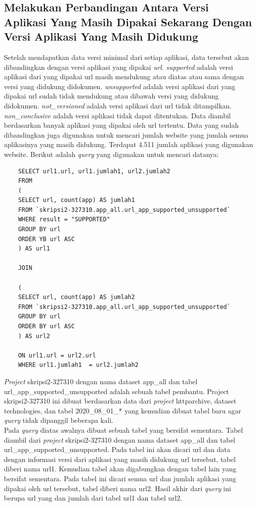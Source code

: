\subsection{Melakukan Perbandingan Antara Versi Aplikasi Yang Masih Dipakai Sekarang Dengan Versi Aplikasi Yang Masih Didukung}
Setelah mendapatkan data versi minimal dari setiap aplikasi, data tersebut akan dibandingkan dengan versi aplikasi yang dipakai \textit{url}. \textit{supported} adalah versi aplikasi dari yang dipakai url masih mendukung atau diatas atau sama dengan versi yang didukung didokumen. \textit{unsupported} adalah versi aplikasi dari yang dipakai url sudah tidak mendukung atau dibawah versi yang didukung didokumen. \textit{not\_versioned} adalah versi aplikasi dari url tidak ditampilkan. \textit{non\_conclusive} adalah versi aplikasi tidak dapat ditentukan. Data diambil berdasarkan banyak aplikasi yang dipakai oleh url tertentu. Data yang sudah dibandingkan juga digunakan untuk mencari jumlah website yang jumlah semua aplikasinya yang masih didukung. Terdapat 4.511 jumlah aplikasi yang digunakan website. Berikut adalah \textit{query} yang digunakan untuk mencari datanya:

\begin{lstlisting}
	SELECT url1.url, url1.jumlah1, url2.jumlah2
	FROM 
	(
	SELECT url, count(app) AS jumlah1
	FROM `skripsi2-327310.app_all.url_app_supported_unsupported`
	WHERE result = "SUPPORTED"
	GROUP BY url
	ORDER YB url ASC
	) AS url1
	
	JOIN 
	
	(
	SELECT url, count(app) AS jumlah2
	FROM `skripsi2-327310.app_all.url_app_supported_unsupported`
	GROUP BY url
	ORDER BY url ASC
	) AS url2
	
	ON url1.url = url2.url
	WHERE url1.jumlah1  = url2.jumlah2 
\end{lstlisting}
\textit{Project} skripsi2-327310 dengan nama dataset app\_all dan tabel url\_app\_supported\_unsupported adalah sebuah tabel pembantu. Project skripsi2-327310 ini dibuat berdasarkan data dari \textit{project} httparchive, dataset technologies, dan tabel 2020\_08\_01\_* yang kemudian dibuat tabel baru agar \textit{query} tidak dipanggil beberapa kali. \\
Pada \textit{query} diatas awalnya dibuat sebuah tabel yang bersifat sementara. Tabel diambil dari  \textit{project} skripsi2-327310 dengan nama dataset app\_all dan tabel url\_app\_supported\_unsupported. Pada tabel ini akan dicari url dan data dengan informasi versi dari aplikasi yang masih didukung url tersebut, tabel diberi nama url1. Kemudian tabel akan digabungkan dengan tabel lain yang bersifat sementara. Pada tabel ini dicari semua url dan jumlah aplikasi yang dipakai oleh url tersebut, tabel diberi nama url2. Hasil akhir dari \textit{query} ini berupa url yang dan jumlah dari tabel url1 dan tabel url2.


